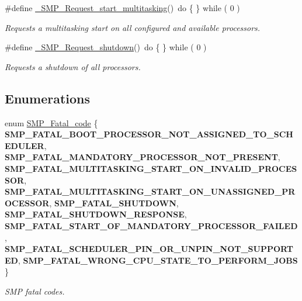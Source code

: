 \begin{DoxyCompactItemize}
\#define \mbox{\hyperlink{group__RTEMSScoreSMP_gaa0a1136be260412ba8b58ba390688d8a}{\+\_\+\+S\+M\+P\+\_\+\+Request\+\_\+start\+\_\+multitasking}}()~do \{ \} while ( 0 )
\begin{DoxyCompactList}\small\item\em Requests a multitasking start on all configured and available processors. \end{DoxyCompactList}\item 
\#define \mbox{\hyperlink{group__RTEMSScoreSMP_ga93fec43bed07a0173284fef946e4c271}{\+\_\+\+S\+M\+P\+\_\+\+Request\+\_\+shutdown}}()~do \{ \} while ( 0 )
\begin{DoxyCompactList}\small\item\em Requests a shutdown of all processors. \end{DoxyCompactList}\end{DoxyCompactItemize}
\subsection*{Enumerations}
\begin{DoxyCompactItemize}
\item 
\mbox{\label{group__RTEMSScoreSMP_ga8449132ae9cc9fe7112f978540e0e635}} 
enum \mbox{\hyperlink{group__RTEMSScoreSMP_ga8449132ae9cc9fe7112f978540e0e635}{S\+M\+P\+\_\+\+Fatal\+\_\+code}} \{ \newline
{\bfseries S\+M\+P\+\_\+\+F\+A\+T\+A\+L\+\_\+\+B\+O\+O\+T\+\_\+\+P\+R\+O\+C\+E\+S\+S\+O\+R\+\_\+\+N\+O\+T\+\_\+\+A\+S\+S\+I\+G\+N\+E\+D\+\_\+\+T\+O\+\_\+\+S\+C\+H\+E\+D\+U\+L\+ER}, 
{\bfseries S\+M\+P\+\_\+\+F\+A\+T\+A\+L\+\_\+\+M\+A\+N\+D\+A\+T\+O\+R\+Y\+\_\+\+P\+R\+O\+C\+E\+S\+S\+O\+R\+\_\+\+N\+O\+T\+\_\+\+P\+R\+E\+S\+E\+NT}, 
{\bfseries S\+M\+P\+\_\+\+F\+A\+T\+A\+L\+\_\+\+M\+U\+L\+T\+I\+T\+A\+S\+K\+I\+N\+G\+\_\+\+S\+T\+A\+R\+T\+\_\+\+O\+N\+\_\+\+I\+N\+V\+A\+L\+I\+D\+\_\+\+P\+R\+O\+C\+E\+S\+S\+OR}, 
{\bfseries S\+M\+P\+\_\+\+F\+A\+T\+A\+L\+\_\+\+M\+U\+L\+T\+I\+T\+A\+S\+K\+I\+N\+G\+\_\+\+S\+T\+A\+R\+T\+\_\+\+O\+N\+\_\+\+U\+N\+A\+S\+S\+I\+G\+N\+E\+D\+\_\+\+P\+R\+O\+C\+E\+S\+S\+OR}, 
\newline
{\bfseries S\+M\+P\+\_\+\+F\+A\+T\+A\+L\+\_\+\+S\+H\+U\+T\+D\+O\+WN}, 
{\bfseries S\+M\+P\+\_\+\+F\+A\+T\+A\+L\+\_\+\+S\+H\+U\+T\+D\+O\+W\+N\+\_\+\+R\+E\+S\+P\+O\+N\+SE}, 
{\bfseries S\+M\+P\+\_\+\+F\+A\+T\+A\+L\+\_\+\+S\+T\+A\+R\+T\+\_\+\+O\+F\+\_\+\+M\+A\+N\+D\+A\+T\+O\+R\+Y\+\_\+\+P\+R\+O\+C\+E\+S\+S\+O\+R\+\_\+\+F\+A\+I\+L\+ED}, 
{\bfseries S\+M\+P\+\_\+\+F\+A\+T\+A\+L\+\_\+\+S\+C\+H\+E\+D\+U\+L\+E\+R\+\_\+\+P\+I\+N\+\_\+\+O\+R\+\_\+\+U\+N\+P\+I\+N\+\_\+\+N\+O\+T\+\_\+\+S\+U\+P\+P\+O\+R\+T\+ED}, 
\newline
{\bfseries S\+M\+P\+\_\+\+F\+A\+T\+A\+L\+\_\+\+W\+R\+O\+N\+G\+\_\+\+C\+P\+U\+\_\+\+S\+T\+A\+T\+E\+\_\+\+T\+O\+\_\+\+P\+E\+R\+F\+O\+R\+M\+\_\+\+J\+O\+BS}
 \}
\begin{DoxyCompactList}\small\item\em S\+MP fatal codes. \end{DoxyCompactList}\end{DoxyCompactItemize}
